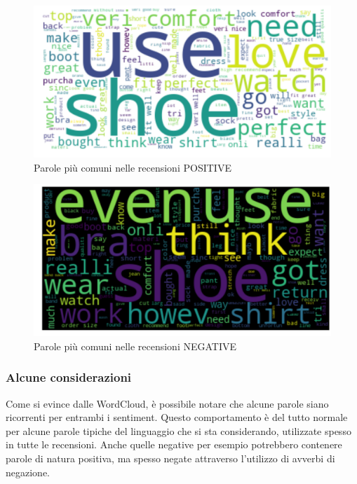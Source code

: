\documentclass[hidelinks, 12pt]{article}
\begin{document}
\begin{figure}[H]
	\centering
	\includegraphics[scale=0.36]{images/04_02_wordcloud_pos.png}
	\caption[Parole più comuni nelle recensioni POSITIVE]{Parole più comuni nelle recensioni POSITIVE}
	\label{fig:wordcloud-pos}
\end{figure}

\begin{figure}[H]
	\centering
	\includegraphics[scale=0.36]{images/04_03_wordcloud_neg.png}
	\caption[Parole più comuni nelle recensioni NEGATIVE]{Parole più comuni nelle recensioni NEGATIVE}
	\label{fig:wordcloud-neg}
\end{figure}


\subsubsection{Alcune considerazioni}

Come si evince dalle WordCloud, è possibile notare che alcune parole siano ricorrenti per entrambi i sentiment. Questo comportamento è del tutto normale per alcune parole tipiche del linguaggio che si sta considerando, utilizzate spesso in tutte le recensioni. Anche quelle negative per esempio potrebbero contenere parole di natura positiva, ma spesso negate attraverso l'utilizzo di avverbi di negazione.
\end{document}
